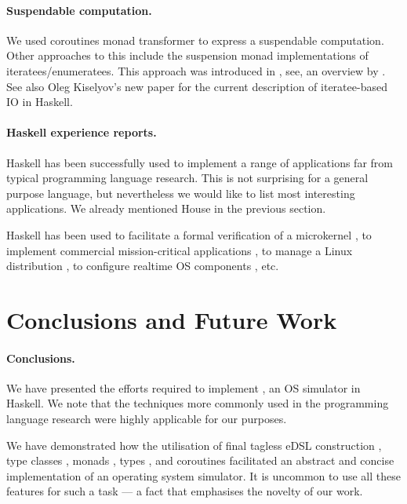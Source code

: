 \paragraph{Suspendable computation.} We used coroutines monad transformer \cite{cmt} to express a suspendable computation.
Other approaches to this include the suspension monad implementations of iteratees/enumeratees. This approach was introduced in \cite{oleg-iteratee}, see, \eg an overview by \citeauthor{lato2010iteratee} \cite{lato2010iteratee}.
See also Oleg Kiselyov's new paper \cite{springerlink:10.1007/978-3-642-29822-6_15} for the current description of iteratee-based IO in Haskell.

\paragraph{Haskell experience reports.}
Haskell has been successfully used to implement a range of applications far from typical programming language research.
This is not surprising for a general purpose language, but nevertheless we would like to list most interesting applications.
We already mentioned House \cite{house} in the previous section.

Haskell has been used to facilitate a formal verification of a
microkernel \cite{Klein:2009:ERS:1631687.1596566}, to implement
commercial mission-critical applications
\cite{Sampson:2009:ERH:1631687.1596578}, to manage a Linux
distribution \cite{Beshers:2007:ERU:1291220.1291184}, to configure
realtime OS components \cite{Jones:2008:ERP:1411203.1411219}, etc.

\section{Conclusions and Future Work}
\label{sec:concl-future-work}

\paragraph{Conclusions.}
We have presented the efforts required to implement \soosim, an OS simulator in Haskell.
We note that the techniques more commonly used in the programming language research were highly applicable for our purposes.

We have demonstrated how the utilisation of final tagless eDSL construction \cite{final_tagless_embedding,Hofer:2008:PED:1449913.1449935}, type classes \cite{Hall:1996:TCH:227699.227700}, monads \cite{Wadler:1990:CM:91556.91592},  types \cite{Abadi:1991:DTS:103135.103138}, and coroutines \cite{coroutines,cmt} facilitated an abstract and concise implementation of an operating system simulator.
It is uncommon to use all these features for such a task --- a fact that emphasises the novelty of our work.

